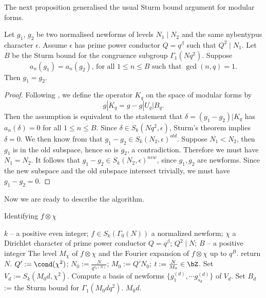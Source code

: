 \documentclass [11pt, proquest] {uwthesis}[2015/03/03]
\begin{document}
The next proposition generalised the usual Sturm bound argument for modular forms. 

\begin{Prop}
Let $g_1$, $g_2$ be two normalised newforms of levels $N_1 \mid N_2$ and the same nybentypus character $\epsilon$. Assume $\epsilon$ has prime power conductor $Q = q^\beta$ such that  $Q^2 \mid N_1$. Let 
$B$ be the Sturm bound for the congruence subgroup $\Gamma_1(Nq^2)$. Suppose 
\[
	a_n(g_1) = a_n(g_2), \, \mbox{for all }1 \leq n \leq B \mbox{ such that } \gcd(n,q) = 1.
\]
Then $g_1 = g_2$. 
\end{Prop}

\begin{proof}
Following \cite{atkin1978twists}, we define the operator $K_q$ on the space of modular forms by
\[
	g|K_q = g - g|U_q|B_q. 
\]
Then the assumption is equivalent to the statement that $\delta  = (g_1 -g_2) |K_q$ has $a_n(\delta) = 0$ for all $1 \leq n \leq B$. Since $\delta \in S_k(Nq^2, \epsilon)$,  Sturm's theorem implies $\delta = 0$. We then know from \cite[Theorem 5.7.1]{diamond2006first}  that $g_1 - g_2 \in S_k(N_2,\epsilon)^{old}$. Suppose $N_1 < N_2$, then $g_1$ is in the old subspace, hence so is $g_2$, a contradiction. Therefore we must have $N_1 = N_2$. It follows that $g_1 - g_2 \in S_k(N_2, \epsilon)^{new}$, since $g_1, g_2$ are newforms. Since the new subspace and the old subspace intersect trivially, we must have $g_1 - g_2  = 0$. 
\end{proof}

Now we are ready to describe the algorithm. 

\begin{algorithm}[H]
\caption{Identifying  $f \otimes \chi$}
\label{alg: twist}
\begin{algorithmic}[1]
    \Require $k$ -- a positive even integer; $f \in S_k(\Gamma_0(N))$ a normalized newform; $\chi$ a Dirichlet character of prime power conductor $Q = q^\beta$; $Q^2 \mid N$;  $B$ -- a positive integer
    \Ensure The level $M_\chi$ of $f \otimes \chi$ and the Fourier expansion of $f \otimes \chi$ up to $q^B$.
    \State return $N$.
    \EndIf
    \State $Q' := \cond(\chi^2)$; $N_0 := \frac{N}{q^{v_q(N)}}$; $M_0 := Q'N_0$; $t := \frac{N}{M_0} \in \bZ$. 
    	\State Set $V_d := S_k(M_0d, \chi^2)$. 
	\State Compute a basis of newforms $\{g_1^{(d)}, \cdots g_{s_d}^{(d)}\}$ of $V_d$.
    	\State Set $B_d$ := the Sturm bound for $\Gamma_1(M_0dq^2)$. 
			\State \Return $M_0d$.
		\EndIf
	\EndFor
    \EndFor	
\end{algorithmic}
\end{algorithm}
\end{document}
